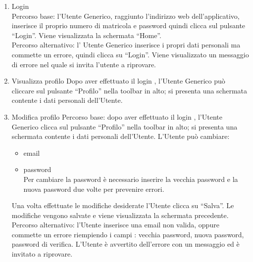 \begin{enumerate}

 \item Login\\
    Percorso base:
    l'Utente Generico, raggiunto l'indirizzo web dell'applicativo, inserisce il proprio numero di matricola e password quindi clicca sul pulsante ``Login''. Viene visualizzata la schermata ``Home''.\\
    Percorso alternativo:
    l' Utente Generico inserisce i propri dati personali ma commette un errore, quindi clicca su ``Login''. Viene visualizzato un messaggio di errore nel quale si invita l'utente a riprovare.
    
 \item Visualizza profilo
    Dopo aver effettuato il login , l'Utente Generico può cliccare sul pulsante ``Profilo'' nella toolbar in alto; si presenta una schermata contente i dati personali dell'Utente.
 \item Modifica profilo
  Percorso base:
  dopo aver effettuato il login , l'Utente Generico clicca sul pulsante ``Profilo'' nella toolbar in alto; si presenta una schermata contente i dati personali dell'Utente.
  L'Utente può cambiare:
  \begin{itemize}
   \item email
   \item password\\
    Per cambiare la password è necessario inserire la vecchia password e la nuova password due volte per prevenire errori.
  \end{itemize}

  Una volta effettuate le modifiche desiderate l'Utente clicca su ``Salva''. Le modifiche vengono salvate e viene visualizzata la schermata precedente.\\
  
  Percorso alternativo:
  l'Utente inserisce una email non valida, oppure commette un errore riempiendo i campi : vecchia password, nuova password, password di verifica. L'Utente è avvertito dell'errore con un messaggio ed è invitato a riprovare.
  

\end{enumerate}



